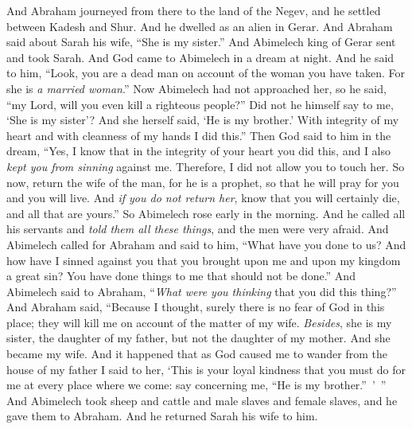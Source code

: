 \begin{biblechapter} %
 And Abraham journeyed from there to the land of the Negev, and he settled between Kadesh and Shur. And he dwelled as an alien in Gerar.
\verse And Abraham said about Sarah his wife, “She is my sister.” And Abimelech king of Gerar sent and took Sarah.
\verse And God came to Abimelech in a dream at night. And he said to him, “Look, you are a dead man on account of the woman you have taken. For she is \textit{a married woman}.”
\verse Now Abimelech had not approached her, so he said, “my Lord, will you even kill a righteous people?”
\verse Did not he himself say to me, ‘She is my sister’? And she herself said, ‘He is my brother.’ With integrity of my heart and with cleanness of my hands I did this.”
\verse Then God said to him in the dream, “Yes, I know that in the integrity of your heart you did this, and I also \textit{kept you from sinning} against me. Therefore, I did not allow you to touch her.
\verse So now, return the wife of the man, for he is a prophet, so that he will pray for you and you will live. And \textit{if you do not return her}, know that you will certainly die, and all that are yours.”
\verse So Abimelech rose early in the morning. And he called all his servants and \textit{told them all these things}, and the men were very afraid.
\verse And Abimelech called for Abraham and said to him, “What have you done to us? And how have I sinned against you that you brought upon me and upon my kingdom a great sin? You have done things to me that should not be done.”
\verse And Abimelech said to Abraham, “\textit{What were you thinking} that you did this thing?”
\verse And Abraham said, “Because I thought, surely there is no fear of God in this place; they will kill me on account of the matter of my wife.
\verse \textit{Besides}, she is my sister, the daughter of my father, but not the daughter of my mother. And she became my wife.
\verse And it happened that as God caused me to wander from the house of my father I said to her, ‘This is your loyal kindness that you must do for me at every place where we come: say concerning me, “He is my brother.” ’ ”
\verse And Abimelech took sheep and cattle and male slaves and female slaves, and he gave them to Abraham. And he returned Sarah his wife to him.

\end{biblechapter}
